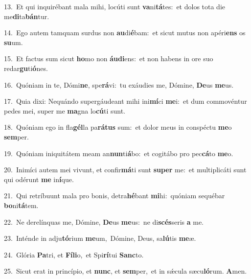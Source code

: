 {\numbfont\textcolor{\numbcolor}{13.}}~Et qui inquirébant mala mihi, locúti sunt \textbf{va}\-ni\-\textbf{tá}\-tes:~\star et dolos tota die me\-\textbf{di}\-ta\-\textbf{bán}\-tur.\par
{\numbfont\textcolor{\numbcolor}{14.}}~Ego autem tamquam surdus non \textbf{au}\-di\-\textbf{é}\-bam:~\star et sicut mutus non apéri\textbf{ens} os \textbf{su}\-um.\par
{\numbfont\textcolor{\numbcolor}{15.}}~Et factus sum sicut \textbf{ho}\-mo non \textbf{áu}\-\textbf{di}ens:~\star et non habens in ore suo redar\-\textbf{gu}\-ti\-\textbf{ó}\-nes.\par
{\numbfont\textcolor{\numbcolor}{16.}}~Quóniam in te, Dómi\-\textbf{ne}\-, spe\-\textbf{rá}\-vi:~\star tu exáudies me, Dómine, \textbf{De}\-us \textbf{me}\-us.\par
{\numbfont\textcolor{\numbcolor}{17.}}~Quia dixi: Nequándo supergáudeant mihi ini\-\textbf{mí}\-ci \textbf{me}\-i:~\star et dum commovéntur pedes mei, super me \textbf{ma}\-gna lo\-\textbf{cú}\-ti sunt.\par
{\numbfont\textcolor{\numbcolor}{18.}}~Quóniam ego in fla\-\textbf{gél}\-la pa\-\textbf{rá}\-\textbf{tus} sum:~\star et dolor meus in conspéctu \textbf{me}\-o \textbf{sem}\-per.\par
{\numbfont\textcolor{\numbcolor}{19.}}~Quóniam iniquitátem meam an\-\textbf{nun}\-ti\-\textbf{á}\-bo:~\star et cogitábo pro pec\-\textbf{cá}\-to \textbf{me}\-o.\par
{\numbfont\textcolor{\numbcolor}{20.}}~Inimíci autem mei vivunt, et confir\-\textbf{má}\-ti sunt \textbf{su}\-\textbf{per} me:~\star et multiplicáti sunt qui odérunt \textbf{me} in\-\textbf{í}\-que.\par
{\numbfont\textcolor{\numbcolor}{21.}}~Qui retríbuunt mala pro bonis, detra\-\textbf{hé}\-bant \textbf{mi}\-hi:~\star quóniam sequébar \textbf{bo}\-ni\-\textbf{tá}\-tem.\par
{\numbfont\textcolor{\numbcolor}{22.}}~Ne derelínquas me, Dómine, \textbf{De}\-us \textbf{me}\-us:~\star ne di\-\textbf{scés}\-seris \textbf{a} me.\par
{\numbfont\textcolor{\numbcolor}{23.}}~Inténde in adju\-\textbf{tó}\-rium \textbf{me}\-um,~\star Dómine, Deus, sa\-\textbf{lú}\-tis \textbf{me}\-æ.\par
{\numbfont\textcolor{\numbcolor}{24.}}~Glória \textbf{Pa}\-tri, et \textbf{Fí}\-\textbf{li}o,~\star et Spi\-\textbf{rí}\-tui \textbf{Sanc}\-to.\par
{\numbfont\textcolor{\numbcolor}{25.}}~Sicut erat in princípio, et \textbf{nunc}\-, et \textbf{sem}\-per,~\star et in sǽcula sæcu\-\textbf{ló}\-rum. \textbf{A}\-men.\par
